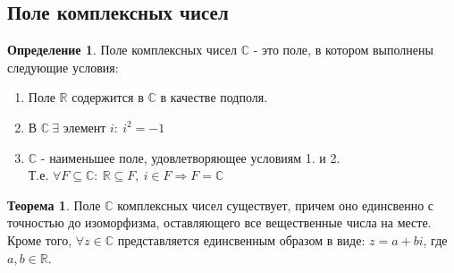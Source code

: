\documentclass[a4paper, 12pt]{article}
\newcommand{\R}{\mathbb R}
\theoremstyle{definition}
\newtheorem*{definition}{Определение}
\newtheorem*{theorem}{Теорема}
\begin{document}
  \subsection{Поле комплексных чисел}
  \begin{definition}
    Поле комплексных чисел $\mathbb{C} $ - это поле, в котором выполнены следующие условия:
    \begin{enumerate}
      \item Поле $\R$ содержится в $\mathbb{C} $ в качестве подполя.
      \item В $\mathbb{C} \ \exists$ элемент $i:\  i^2 = -1$
      \item $\mathbb{C} $ - наименьшее поле, удовлетворяющее условиям 1. и 2.\\
      Т.е. $\forall F\subseteq \mathbb{C}: \ \R \subseteq F, \ i\in F \Longrightarrow  F = \mathbb{C}$
    \end{enumerate}
     
  \end{definition} 
  \begin{theorem}
    Поле $\mathbb{C}$ комплексных чисел существует, причем оно единсвенно с точностью до изоморфизма, оставляющего все вещественные числа на месте. Кроме того, $\forall z \in \mathbb{C}$ представляется единсвенным образом в виде: $z = a + bi$, где $a, b \in \R$.
  \end{theorem} 
\end{document}

